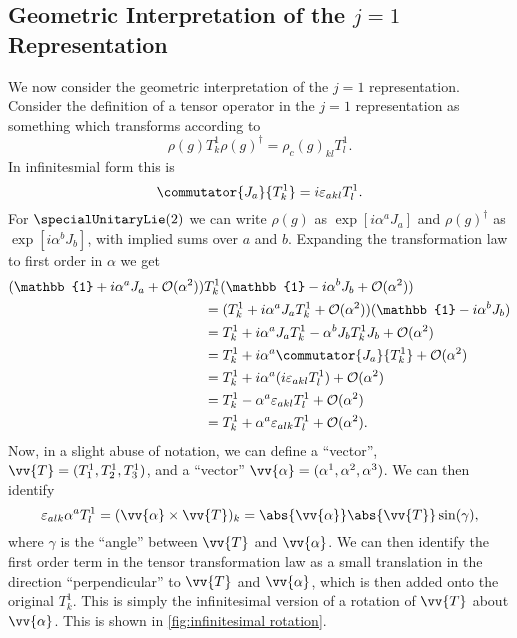 \documentclass[fleqn]{NotesClass}
\newcommand*{\hermit}{\dagger}
\newcommand*{\ident}{\mathbb{1}}
\newcommand*{\order}{\mathcal{O}}
\begin{document}
    \subsection{Geometric Interpretation of the \texorpdfstring{\(j = 1\)}{j = 1} Representation}
    We now consider the geometric interpretation of the \(j = 1\) representation.
    Consider the definition of a tensor operator in the \(j = 1\) representation as something which transforms according to
    \begin{equation}
        \rho(g) T_{k}^1 \rho(g)^\hermit = \rho_c(g)_{kl}T_l^1.
    \end{equation}
    In infinitesmial form this is
    \begin{equation}
        \commutator{J_a}{T_k^1} = i\varepsilon_{akl}T_l^1.
    \end{equation}
    For \(\specialUnitaryLie(2)\) we can write \(\rho(g)\) as \(\exp[i\alpha^aJ_a]\) and \(\rho(g)^\hermit\) as \(\exp[i\alpha^bJ_b]\), with implied sums over \(a\) and \(b\).
    Expanding the transformation law to first order in \(\alpha\) we get
    \begin{align}
        (\ident + i\alpha^aJ_a + \order(\alpha^2))&T_k^1 (\ident - i\alpha^bJ_b + \order(\alpha^2))\\
        &= (T_k^1 + i\alpha^aJ_aT_k^1 + \order(\alpha^2))(\ident - i\alpha^bJ_b)\\
        &= T_k^1 + i\alpha^aJ_aT_k^1 - \alpha^bJ_bT_k^1J_b + \order(\alpha^2)\\
        &= T_k^1 + i\alpha^a\commutator{J_a}{T_k^1} + \order(\alpha^2)\\
        &= T_k^1 + i\alpha^a(i\varepsilon_{akl}T_l^1) + \order(\alpha^2)\\
        &= T_k^1 - \alpha^a\varepsilon_{akl}T_l^1 + \order(\alpha^2)\\
        &= T_k^1 + \alpha^a\varepsilon_{alk}T_l^1 + \order(\alpha^2).
    \end{align}
    Now, in a slight abuse of notation, we can define a \enquote{vector}, \(\vv{T} = (T_1^1, T_2^1, T_3^1)\), and a \enquote{vector} \(\vv{\alpha} = (\alpha^1, \alpha^2, \alpha^3)\).
    We can then identify
    \begin{equation}
        \varepsilon_{alk}\alpha^aT_l^1 = (\vv{\alpha} \times \vv{T})_k = \abs{\vv{\alpha}}\abs{\vv{T}}\sin(\gamma),
    \end{equation}
    where \(\gamma\) is the \enquote{angle} between \(\vv{T}\) and \(\vv{\alpha}\).
    We can then identify the first order term in the tensor transformation law as a small translation in the direction \enquote{perpendicular} to \(\vv{T}\) and \(\vv{\alpha}\), which is then added onto the original \(T_k^1\).
    This is simply the infinitesimal version of a rotation of \(\vv{T}\) about \(\vv{\alpha}\).
    This is shown in \cref{fig:infinitesimal rotation}.
    
\end{document}
